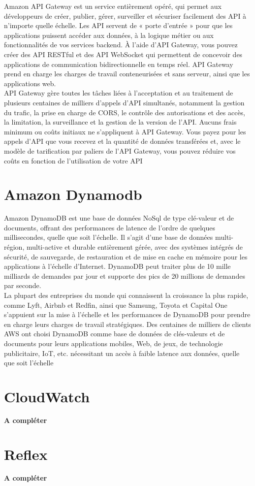 Amazon API Gateway est un service entièrement opéré, qui permet aux développeurs de créer, publier,
gérer, surveiller et sécuriser facilement des API à n’importe quelle échelle. Les API servent de « porte
d’entrée » pour que les applications puissent accéder aux données, à la logique métier ou aux fonctionnalités de vos services backend. À l’aide d’API Gateway, vous pouvez créer des API RESTful et des API
WebSocket qui permettent de concevoir des applications de communication bidirectionnelle en temps réel.
API Gateway prend en charge les charges de travail conteneurisées et sans serveur, ainsi que les applications
web.\\
API Gateway gère toutes les tâches liées à l’acceptation et au traitement de plusieurs centaines de milliers
d’appels d’API simultanés, notamment la gestion du trafic, la prise en charge de CORS, le contrôle des
autorisations et des accès, la limitation, la surveillance et la gestion de la version de l’API. Aucuns frais
minimum ou coûts initiaux ne s’appliquent à API Gateway. Vous payez pour les appels d’API que vous
recevez et la quantité de données transférées et, avec le modèle de tarification par paliers de l’API Gateway,
vous pouvez réduire vos coûts en fonction de l’utilisation de votre API




\section{Amazon Dynamodb}
Amazon DynamoDB est une base de données NoSql de type clé-valeur et de documents, offrant des performances de latence de l’ordre de quelques millisecondes, quelle que soit l’échelle. Il s’agit d’une base
de données multi-région, multi-active et durable entièrement gérée, avec des systèmes intégrés de sécurité,
de sauvegarde, de restauration et de mise en cache en mémoire pour les applications à l’échelle d’Internet.
DynamoDB peut traiter plus de 10 mille milliards de demandes par jour et supporte des pics de 20 millions
de demandes par seconde.\\

La plupart des entreprises du monde qui connaissent la croissance la plus rapide, comme Lyft, Airbnb et
Redfin, ainsi que Samsung, Toyota et Capital One s’appuient sur la mise à l’échelle et les performances de
DynamoDB pour prendre en charge leurs charges de travail stratégiques.
Des centaines de milliers de clients AWS ont choisi DynamoDB comme base de données de clés-valeurs et
de documents pour leurs applications mobiles, Web, de jeux, de technologie publicitaire, IoT, etc. nécessitant un accès à faible latence aux données, quelle que soit l’échelle

\section{CloudWatch}
\textbf{A compléter}
\section{Reflex}
\textbf{A compléter}
